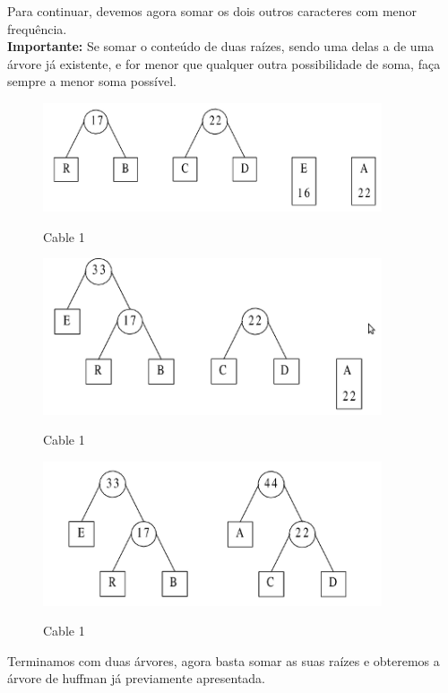 \documentclass{article}
\begin{document}
\newpage

Para continuar, devemos agora somar os dois outros caracteres com menor frequência.\\
\textbf{Importante:} Se somar o conteúdo de duas raízes, sendo uma delas a de uma árvore já
existente, e for menor que qualquer outra possibilidade de soma, faça sempre a menor soma
possível.\\

\begin{figure}[h]
    \center
    \includegraphics[width=10cm]{imagens/huffman4.png}
    \label{cable}
    \caption{Cable 1}
\end{figure}

\begin{figure}[h]
    \center
    \includegraphics[width=10cm]{imagens/huffman5.png}
    \label{cable}
    \caption{Cable 1}
\end{figure}

\newpage

\begin{figure}[h]
    \center
    \includegraphics[width=10cm]{imagens/huffman6.png}
    \label{cable}
    \caption{Cable 1}
\end{figure}

Terminamos com duas árvores, agora basta somar as suas raízes e obteremos a árvore de huffman já
previamente apresentada.
\end{document}
